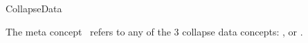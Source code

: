 
\begin{ccRefConcept}{CollapseData}


\ccDefinition

The meta concept \ccRefName\ refers to any of the 3 collapse data concepts: ,  or .



\ccRefines
{}

\end{ccRefConcept}

